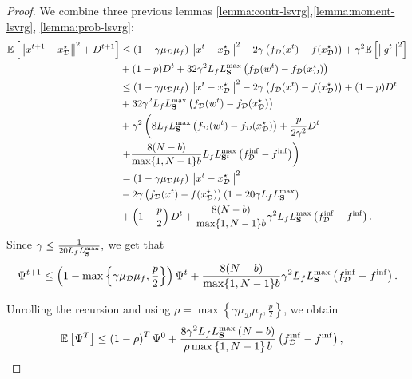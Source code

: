 \documentclass{article}
\newcommand{\bb}{\mathbb}
\newcommand{\cD}{\mathcal{D}}
\newcommand{\Exp}[1]{{\bb E}\left[#1\right]}
\theoremstyle{plain}
\newcommand{\tf}{f_{\mathcal{D}}}
\newcommand{\mS}{{\bf S}}
\theoremstyle{plain}
\theoremstyle{definition}
\theoremstyle{remark}
\begin{document}
\begin{proof} We combine three previous lemmas \ref{lemma:contr-lsvrg},\ref{lemma:moment-lsvrg}, \ref{lemma:prob-lsvrg}:
	\begin{equation*}
		\begin{split}
			\Exp{\left\|x^{t+1} - x_\cD^\star\right\|^2 + D^{t+1}} & \leq \left(1-\gamma\mu_{\mathcal{D}}\mu_f\right)\left\|x^{t}- x_\cD^\star\right\|^2 - 2\gamma\left(\tf(x^t) - f(x_\cD^\star)\right) + \gamma^2\Exp{\left\|g^t\right\|^2}\\
			& + (1-p)D^t + 32\gamma^2L_fL_{\mS}^{\max} \left(\tf(w^t) - \tf(x_\cD^\star)\right)\\
			& \leq \left(1-\gamma\mu_{\mathcal{D}}\mu_f\right)\left\|x^{t}- x_\cD^\star\right\|^2 - 2\gamma\left(\tf(x^t) - f(x_\cD^\star)\right) + (1-p)D^t\\
			& + 32\gamma^2L_fL_{\mS}^{\max} \left(\tf(w^t) - \tf(x_\cD^\star)\right)\\
			& + \gamma^2\left(8L_fL_{\mS}^{\max} \left(\tf(w^t) - \tf(x_\cD^\star)\right) + \frac{p}{2\gamma^2}D^t\right.\\
                & \left.+  \frac{8(N-b)}{\max\{1,N-1\}b} L_fL_{\mS^t}^{\max}\left(\tf^{\inf} - f^{\inf}\right)\right)\\
			& = \left(1-\gamma\mu_{\mathcal{D}}\mu_f\right)\left\|x^{t}- x_\cD^\star\right\|^2\\
                &- 2\gamma\left(\tf(x^t) - f(x_\cD^\star)\right)\left(1 - 20\gamma L_fL_{\mS}^{\max}\right)\\
			& + \left(1-\frac{p}{2}\right)D^t +  \frac{8(N-b)}{\max\{1,N-1\}b} \gamma^2 L_fL_{\mS}^{\max}\left(\tf^{\inf} - f^{\inf}\right).
		\end{split}
	\end{equation*}
	Since $\gamma\leq \frac{1}{20L_fL_{\mS}^{\max}},$ we get that
	\begin{equation*}
		\begin{split}
			\Psi^{t+1} \leq \left(1 - \max\left\lbrace\gamma\mu_{\mathcal{D}}\mu_f, \frac{p}{2}\right\rbrace\right)\Psi^t + \frac{8(N-b)}{\max\{1,N-1\}b} \gamma^2 L_fL_{\mS}^{\max}\left(\tf^{\inf} - f^{\inf}\right).
		\end{split}
	\end{equation*}

Unrolling the recursion and using $\rho = \max\left\lbrace\gamma\mu_{\mathcal{D}}\mu_f, \frac{p}{2}\right\rbrace$, we obtain
  	\begin{equation*}
	\begin{split}
		\mathbb{E} \left[\Psi^{T}\right]&\leq \left(1 - \rho \right)^T\Psi^0  + \frac{8\gamma^2L_fL_{\mS}^{\max}\left(N - b\right) }{\rho  \max\left\lbrace  1, N - 1\right\rbrace b} \left(\tf^{\inf}- f^{\inf}\right),
	\end{split}
    \end{equation*}


\end{proof}
\end{document}
